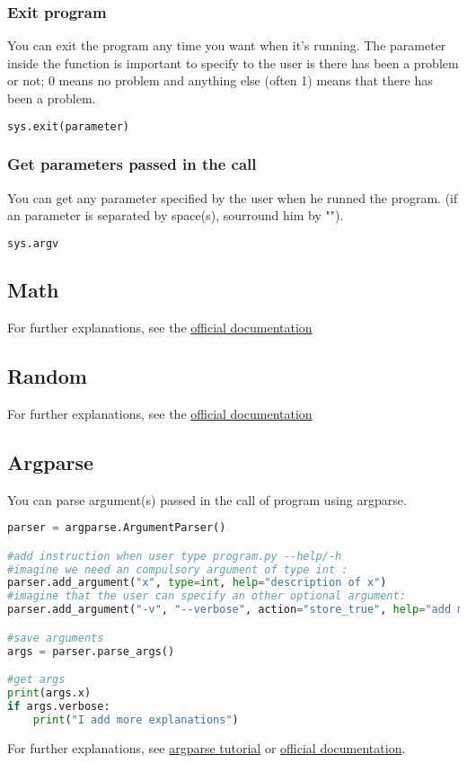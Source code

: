 \documentclass[a4paper, 12pt, titlepage]{scrartcl} %
\begin{document}
\subsubsection{Exit program}
You can exit the program any time you want when it's running. The parameter inside the function is important to specify to the user is there has been a problem or not; 0 means no problem and anything else (often 1) means that there has been a problem.
\begin{lstlisting}[language=Python]
sys.exit(parameter)
\end{lstlisting}

\subsubsection{Get parameters passed in the call}
You can get any parameter specified by the user when he runned the program. (if an parameter is separated by space(s), sourround him by "").
\begin{lstlisting}[language=Python]
sys.argv
\end{lstlisting}

\subsection{Math}
For further explanations, see the \href{https://docs.python.org/3/library/math.html}{official documentation}

\subsection{Random}
For further explanations, see the \href{https://docs.python.org/3/library/random.html}{official documentation}

\subsection{Argparse}
You can parse argument(s) passed in the call of program using argparse.
\begin{lstlisting}[language=Python]
parser = argparse.ArgumentParser()

#add instruction when user type program.py --help/-h
#imagine we need an compulsory argument of type int :
parser.add_argument("x", type=int, help="description of x")
#imagine that the user can specify an other optional argument:
parser.add_argument("-v", "--verbose", action="store_true", help="add more explanation")

#save arguments
args = parser.parse_args()

#get args
print(args.x)
if args.verbose:
    print("I add more explanations")
\end{lstlisting}
For further explanations, see \href{http://www.sharelatex.com}{argparse tutorial} or  \href{https://docs.python.org/3/library/argparse.html}{official documentation}.
\end{document}
